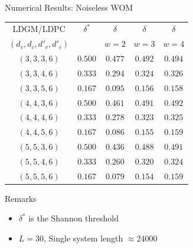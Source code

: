 \documentclass[10pt,presentation]{beamer}
\begin{document}
\begin{frame}{Numerical Results: Noiseless WOM}
\begin{center}
\begin{tabular}{|c|c|c|c|c|}
\hline
LDGM/LDPC & $\delta^{*}$ & $\delta$ & $\delta$ & $\delta$ \\
$(d_v,d_c,d'_v,d'_c)$ & & $w=2$ & $w=3$ & $w=4$ \\
\hline
$(3,3,3,6)$  & $0.500$ & $0.477$ & $0.492$ & $0.494$\\
$(3,3,4,6)$  & $0.333$ & $0.294$ & $0.324$ & $0.326$\\
$(3,3,5,6)$  & $0.167$ & $0.095$ & $0.156$ & $0.158$\\
$(4,4,3,6)$  & $0.500$ & $0.461$ & $0.491$ & $0.492$\\
$(4,4,4,6)$  & $0.333$ & $0.278$ & $0.323$ & $0.325$\\
$(4,4,5,6)$  & $0.167$ & $0.086$ & $0.155$ & $0.159$\\
$(5,5,3,6)$  & $0.500$ & $0.436$ & $0.488$ & $0.491$\\
$(5,5,4,6)$  & $0.333$ & $0.260$ & $0.320$ & $0.324$\\
$(5,5,5,6)$  & $0.167$ & $0.079$ & $0.154$ & $0.159$\\
\hline  
\end{tabular}
\end{center}
\begin{block}{Remarks}
  \begin{itemize}
  \item $\delta^*$ is the Shannon threshold
  \item $L=30$, Single system length $\approx 24000$
  \end{itemize}
\end{block}
\end{frame}
\end{document}
